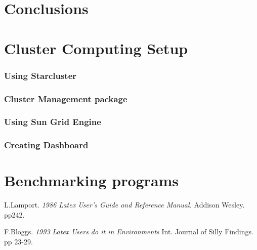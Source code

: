 \documentclass[12pt,a4paper]{report}
\begin{document}
\chapter{Conclusions}


\appendix

\chapter{Cluster Computing Setup}
\subsection{Using Starcluster}
\subsection{Cluster Management package}
\subsection{Using Sun Grid Engine}
\subsection{Creating Dashboard}
\chapter{Benchmarking  programs}


\begin{thebibliography}{100}

 L.Lamport. {\em 1986 Latex User's Guide
and Reference Manual.} Addison Wesley. pp242.

 F.Bloggs. {\em 1993 Latex Users do it
in Environments} Int. Journal of Silly Findings. pp 23-29.

\end{thebibliography}
\end{document}
